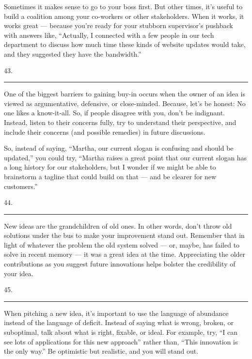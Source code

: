 \documentclass[UTF8,11pt]{ctexart}
\begin{document}
Sometimes it makes sense to go to your boss first. But other times, it’s useful to build a coalition among your co-workers or other stakeholders. When it works, it works great — because you’re ready for your stubborn supervisor’s pushback with answers like, “Actually, I connected with a few people in our tech department to discuss how much time these kinds of website updates would take, and they suggested they have the bandwidth.”


43. \par\noindent\rule{.95\linewidth}{.4pt}\par


One of the biggest barriers to gaining buy-in occurs when the owner of an idea is viewed as argumentative, defensive, or close-minded. Because, let’s be honest: No one likes a know-it-all. So, if people disagree with you, don’t be indignant. Instead, listen to their concerns fully, try to understand their perspective, and include their concerns (and possible remedies) in future discussions.


So, instead of saying, “Martha, our current slogan is confusing and should be updated,” you could try, “Martha raises a great point that our current slogan has a long history for our stakeholders, but I wonder if we might be able to brainstorm a tagline that could build on that — and be clearer for new customers.”


44. \par\noindent\rule{.95\linewidth}{.4pt}\par


New ideas are the grandchildren of old ones. In other words, don’t throw old solutions under the bus to make your improvement stand out. Remember that in light of whatever the problem the old system solved — or, maybe, has failed to solve in recent memory — it was a great idea at the time. Appreciating the older contributions as you suggest future innovations helps bolster the credibility of your idea.


45. \par\noindent\rule{.95\linewidth}{.4pt}\par


When pitching a new idea, it’s important to use the language of abundance instead of the language of deficit. Instead of saying what is wrong, broken, or suboptimal, talk about what is right, fixable, or ideal. For example, try, “I can see lots of applications for this new approach” rather than, “This innovation is the only way.” Be optimistic but realistic, and you will stand out.
\end{document}
